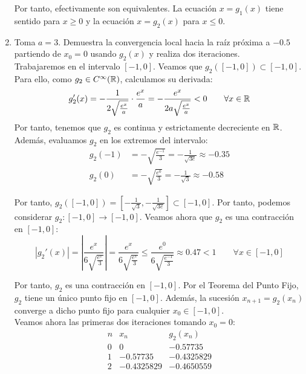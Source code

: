 \begin{ejercicio}
\begin{enumerate}
        Por tanto, efectivamente son equivalentes. La ecuación $x=g_1(x)$ tiene sentido para $x\geq 0$ y la ecuación $x=g_2(x)$ para $x\leq 0$.
        \item Toma $a = 3$. Demuestra la convergencia local hacia la raíz próxima a $-0.5$ partiendo de $x_0 = 0$ usando $g_2(x)$ y realiza dos iteraciones.\\
        
        Trabajaremos en el intervalo $[-1,0]$. Veamos que $g_2\left([-1,0]\right) \subset [-1,0]$. Para ello, como $g_2\in C^\infty(\mathbb{R})$, calculamos su derivada:
        \begin{align*}
            g_2'(x) = -\frac{1}{2\sqrt{\frac{e^x}{a}}}\cdot \frac{e^x}{a} = -\frac{e^x}{2a\sqrt{\frac{e^x}{a}}}<0\qquad \forall x\in \mathbb{R}
        \end{align*}
        Por tanto, tenemos que $g_2$ es continua y estrictamente decreciente en $\mathbb{R}$. Además, evaluamos $g_2$ en los extremos del intervalo:
        \begin{align*}
            g_2(-1) &= -\sqrt{\frac{e^{-1}}{3}} = -\frac{1}{\sqrt{3e}}\approx -0.35\\
            g_2(0) &= -\sqrt{\frac{e^0}{3}} = -\frac{1}{\sqrt{3}}\approx -0.58
        \end{align*}

        Por tanto, $g_2\left([-1,0]\right)=\left[-\frac{1}{\sqrt{3}}, -\frac{1}{\sqrt{3e}}\right]\subset [-1,0]$. Por tanto, podemos considerar $g_2: [-1,0]\to [-1,0]$.
        Veamos ahora que $g_2$ es una contracción en $[-1,0]$:
        \begin{equation*}
            |g_2'(x)|=\left|\frac{e^x}{6\sqrt{\frac{e^x}{3}}}\right|=\frac{e^x}{6\sqrt{\frac{e^x}{3}}}\leq 
            \frac{e^0}{6\sqrt{\frac{e^{-1}}{3}}}\approx 0.47<1\qquad \forall x\in [-1,0]
        \end{equation*}

        Por tanto, $g_2$ es una contracción en $[-1,0]$. Por el Teorema del Punto Fijo, $g_2$ tiene un único punto fijo en $[-1,0]$. Además, la sucesión $x_{n+1}=g_2(x_n)$ converge a dicho punto fijo para cualquier $x_0\in [-1,0]$.\\
        Veamos ahora las primeras dos iteraciones tomando $x_0=0$:
        \begin{equation*}
            \begin{array}{c|c|c}
                n & x_n & g_2(x_n)\\ \hline
                0 & 0 & -0.57735\\
                1 & -0.57735 & -0.4325829\\
                2 & -0.4325829 & -0.4650559
            \end{array}
        \end{equation*}


\end{enumerate}
\end{ejercicio}
